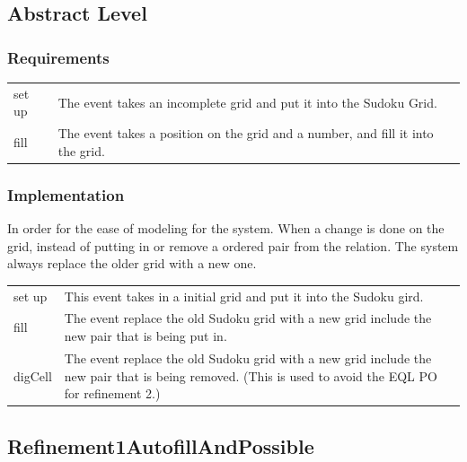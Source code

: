 \documentclass[a4paper]{article}
\begin{document}
\subsection{Abstract Level}
\subsubsection{Requirements}
\begin{center}
\begin{tabular}{|p{3.5cm}|p{10cm}|}
\hline
\color{blue}{Requirements} & \color{blue}{Function}\\
  \hline
  set up & The event takes an incomplete grid and put it into the Sudoku Grid.\\
  \hline
  fill & The event takes a position on the grid and a number, and fill it into the grid.\\
  \hline
\end{tabular}
\end{center}

\subsubsection{Implementation}

\indent\indent In order for the ease of modeling for the system. When a change is done on the grid, instead of putting in or remove a ordered pair from the relation. The system always replace the older grid with a new one.
\begin{center}
\begin{tabular}{|p{3.5cm}|p{10cm}|}
\hline
\color{blue}{Event} & \color{blue}{Usage}\\
\hline
  set up & This event takes in a initial grid and put it into the Sudoku gird.\\
  \hline
  fill & The event replace the old Sudoku grid with a new grid include the new pair that is being put in.\\
  \hline
  digCell & The event replace the old Sudoku grid with a new grid include the new pair that is being removed. (This is used to avoid the EQL PO for refinement 2.)\\
  \hline
\end{tabular}
\end{center}
\newpage
\subsection{Refinement1AutofillAndPossible}
\end{document}
